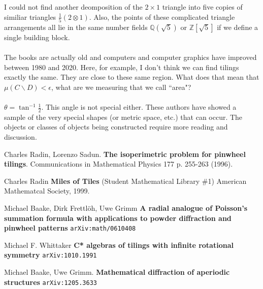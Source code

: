 \documentclass[12pt]{article}
\begin{document}
I could not find another deomposition of the $2 \times 1$ triangle into five copies of similiar triangles $\frac{1}{5}(2 \otimes 1)$.  Also, the points of these complicated triangle arrangements all lie in the same number fields $\mathbb{Q}(\sqrt{5})$ or $\mathbb{Z}[\sqrt{5}]$ if we define a single building block. \\ \\
The books are actually old and computers and computer graphics have improved between 1980 and 2020. Here, for example, I don't think we can find tilings exactly the same.  They are close to these same region.  What does that mean that $\mu(C \backslash D) < \epsilon$, what are we measuring that we call ``area"? \\ \\
$\theta = \tan^{-1} \frac{1}{2}$.  This angle is not special either.  These authors have showed a sample of the very special shapes (or metric space, etc.) that can occur.  The objects or classes of objects being constructed require more reading and discussion.

\vfill



\begin{thebibliography}{}

\item Charles Radin, Lorenzo Sadun.  \textbf{The isoperimetric problem for pinwheel tilings}. Communications in Mathematical Physics 177 p. 255-263 (1996).
\item Charles Radin \textbf{Miles of Tiles} (Student Mathematical Library \#1) American Mathematcal Society, 1999.
\item 
Michael Baake, Dirk Frettlöh, Uwe Grimm \textbf{A radial analogue of Poisson's summation formula with applications to powder diffraction and pinwheel patterns} \texttt{arXiv:math/0610408}
\item Michael F. Whittaker \textbf{C* algebras of tilings with infinite rotational symmetry} \texttt{arXiv:1010.1991}
\item Michael Baake, Uwe Grimm. \textbf{Mathematical diffraction of aperiodic structures} \texttt{arXiv:1205.3633}
\end{thebibliography} 
\end{document}
